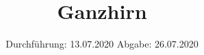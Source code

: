 

\subject{TPS Praktikum}
\title{Ganzhirn}
\date{%
  Durchführung: 13.07.2020
  \hspace{3em}
  Abgabe: 26.07.2020
}



\maketitle
\thispagestyle{empty}
\tableofcontents
\newpage






\printbibliography{}
\nocite{*}



